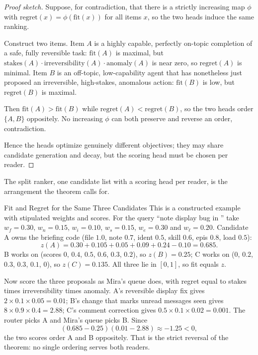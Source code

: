 \documentclass[11pt,a4paper]{article}
\theoremstyle{definition}
\theoremstyle{plain}
\begin{document}
\begin{proof}[Proof sketch]
\setlength{\parskip}{4pt plus 1pt}
Suppose, for contradiction, that there is a strictly increasing map $\phi$ with
$\mathrm{regret}(x)=\phi(\mathrm{fit}(x))$ for all items $x$, so the two heads induce
the same ranking.

Construct two items. Item $A$ is a highly capable, perfectly
on-topic completion of a safe, fully reversible task: $\mathrm{fit}(A)$ is maximal,
but $\mathrm{stakes}(A)\cdot\mathrm{irreversibility}(A)\cdot\mathrm{anomaly}(A)$ is
near zero, so $\mathrm{regret}(A)$ is minimal. Item $B$ is an off-topic, low-capability
agent that has nonetheless just proposed an irreversible, high-stakes, anomalous
action: $\mathrm{fit}(B)$ is low, but $\mathrm{regret}(B)$ is maximal.

Then
$\mathrm{fit}(A)>\mathrm{fit}(B)$ while $\mathrm{regret}(A)<\mathrm{regret}(B)$, so the
two heads order $\{A,B\}$ oppositely. No increasing $\phi$ can both preserve and reverse
an order, contradiction.

Hence the heads optimize genuinely different objectives; they
may share candidate generation and decay, but the scoring head must be chosen per
reader.
\end{proof}

\noindent The split ranker, one candidate list with a scoring head per reader,
is the arrangement the theorem calls for.

\begin{pdexample}{Fit and Regret for the Same Three Candidates}
\setlength{\parskip}{4pt plus 1pt}
This is a constructed example with stipulated weights and scores. For the
query ``note display bug in '' take $w_f=0.30$,
$w_n=0.15$, $w_i=0.10$, $w_s=0.15$, $w_e=0.30$ and $w_\ell=0.20$. Candidate A
owns the briefing code (file $1.0$, note $0.7$, ident $0.5$, skill $0.6$, epis
$0.8$, load $0.5$):
\[
z(A)=0.30+0.105+0.05+0.09+0.24-0.10=0.685.
\]
B works on  (scores $0$, $0.4$, $0.5$, $0.6$, $0.3$,
$0.2$), so $z(B)=0.25$; C works on  ($0$, $0.2$,
$0.3$, $0.3$, $0.1$, $0$), so $z(C)=0.135$. All three lie in $[0,1]$, so fit
equals $z$.

Now score the three proposals as Mira's queue does, with regret equal to
stakes times irreversibility times anomaly. A's reversible display fix gives
$2\times0.1\times0.05=0.01$; B's change that marks unread messages seen gives
$8\times0.9\times0.4=2.88$; C's comment correction gives
$0.5\times0.1\times0.02=0.001$. The router picks A and Mira's queue picks B.
Since
\[
(0.685-0.25)(0.01-2.88)\approx-1.25<0,
\]
the two scores order A and B oppositely. That is the strict reversal of the
theorem: no single ordering serves both readers.
\end{pdexample}
\end{document}
